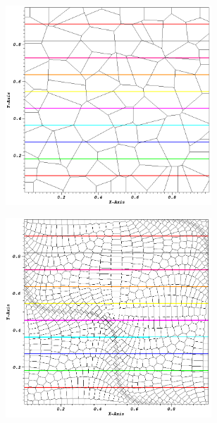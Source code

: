 \begin{figure}
\begin{subfigure}[b]{0.45\textwidth}
		\caption{}
	\end{subfigure}
	\hfill
	\begin{subfigure}[b]{0.45\textwidth}
		\centering
		\includegraphics[width=0.85\textwidth]{figures/sec_DSA/SIP_poly_lin_contour.png}
		\caption{}
	\end{subfigure}
	\vfill
	\begin{subfigure}[b]{0.45\textwidth}
		\centering
		\includegraphics[width=0.85\textwidth]{figures/sec_DSA/SIP_sine_poly_lin_contour.png}
		\caption{}
	\end{subfigure}

\end{figure}
